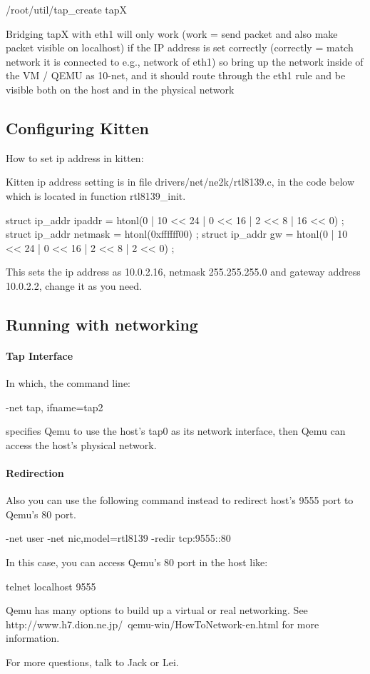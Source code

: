 \documentclass[11pt]{article}
\begin{document}
/root/util/tap\_create tapX

Bridging tapX with eth1 will only work (work = send packet and also make packet visible on localhost) if the IP address is set correctly (correctly = match network it is connected to  e.g., network of eth1)  so bring up the network inside of the VM / QEMU as 10-net, and it should route through the eth1 rule and be visible both on the host and in the physical network


\subsection{Configuring Kitten}

How to set ip address in kitten:

Kitten ip address setting is in file drivers/net/ne2k/rtl8139.c, in the code below which is located in function rtl8139\_init.

  struct ip\_addr ipaddr = { htonl(0 | 10 << 24 | 0 << 16 | 2 << 8 | 16 << 0) }; 
  struct ip\_addr netmask = { htonl(0xffffff00) }; 
  struct ip\_addr gw = { htonl(0 | 10 << 24 | 0 << 16 | 2 << 8 | 2 << 0) };

This sets the ip address as 10.0.2.16, netmask 255.255.255.0 and gateway address 10.0.2.2, change it as you need.



\subsection{Running with networking}

\paragraph*{Tap Interface}
In which, the command line: 

-net tap, ifname=tap2

specifies Qemu to use the host's tap0 as its network interface, then Qemu can access the host's physical network.

\paragraph*{Redirection}

Also you can use the following command instead to redirect host's 9555 port to Qemu's 80 port.

-net user -net nic,model=rtl8139  -redir tcp:9555::80

In this case, you can access Qemu's 80 port in the host like:

telnet localhost 9555

Qemu has many options to build up a virtual or real networking. See http://www.h7.dion.ne.jp/~qemu-win/HowToNetwork-en.html for more information.




For more questions, talk to Jack or Lei.
\end{document}
